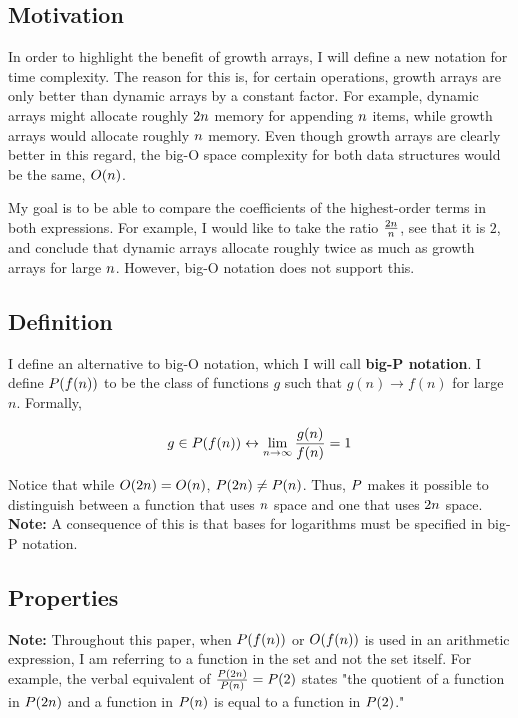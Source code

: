 \subsection{Motivation}

In order to highlight the benefit of growth arrays, I will define a new notation for time complexity. The reason for this is, for certain operations, growth arrays are only better than dynamic arrays by a constant factor. For example, dynamic arrays might allocate roughly $2n$ memory for appending $n$ items, while growth arrays would allocate roughly $n$ memory. Even though growth arrays are clearly better in this regard, the big-O space complexity for both data structures would be the same, $O(n)$.

My goal is to be able to compare the coefficients of the highest-order terms in both expressions. For example, I would like to take the ratio $\frac{2n}{n}$, see that it is $2$, and conclude that dynamic arrays allocate roughly twice as much as growth arrays for large $n$. However, big-O notation does not support this.

\subsection{Definition}

I define an alternative to big-O notation, which I will call \textbf{big-P notation}. I define $P(f(n))$ to be the class of functions $g$ such that $g(n) \to f(n)$ for large $n$. Formally,

$$
g \in P(f(n)) \leftrightarrow \lim_{n \to \infty} \frac{g(n)}{f(n)} = 1
$$

Notice that while $O(2n) = O(n)$, $P(2n) \neq P(n)$. Thus, $P$ makes it possible to distinguish between a function that uses $n$ space and one that uses $2n$ space. \textbf{Note:} A consequence of this is that bases for logarithms must be specified in big-P notation.

\subsection{Properties}
\label{BigPProperties}

\textbf{Note:} Throughout this paper, when $P(f(n))$ or $O(f(n))$ is used in an arithmetic expression, I am referring to a function in the set and not the set itself. For example, the verbal equivalent of $\frac{P(2n)}{P(n)} = P(2)$ states "the quotient of a function in $P(2n)$ and a function in $P(n)$ is equal to a function in $P(2)$."


